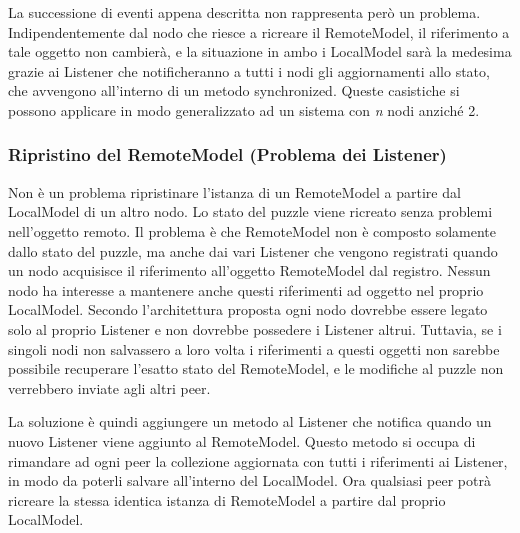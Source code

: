 \noindent La successione di eventi appena descritta non rappresenta però un problema. Indipendentemente dal nodo che riesce a ricreare il RemoteModel, il riferimento a tale oggetto non cambierà, e la situazione in ambo i LocalModel sarà la medesima grazie ai Listener che notificheranno a tutti i nodi gli aggiornamenti allo stato, che avvengono all'interno di un metodo synchronized. Queste casistiche si possono applicare in modo generalizzato ad un sistema con \textit{n} nodi anziché 2.

\subsubsection{Ripristino del RemoteModel (Problema dei Listener)}
Non è un problema ripristinare l'istanza di un RemoteModel a partire dal LocalModel di un altro nodo. Lo stato del puzzle viene ricreato senza problemi nell'oggetto remoto. Il problema è che RemoteModel non è composto solamente dallo stato del puzzle, ma anche dai vari Listener che vengono registrati quando un nodo acquisisce il riferimento all'oggetto RemoteModel dal registro.\newline
Nessun nodo ha interesse a mantenere anche questi riferimenti ad oggetto nel proprio LocalModel. Secondo l'architettura proposta ogni nodo dovrebbe essere legato solo al proprio Listener e non dovrebbe possedere i Listener altrui.\newline
Tuttavia, se i singoli nodi non salvassero a loro volta i riferimenti a questi oggetti non sarebbe possibile recuperare l'esatto stato del RemoteModel, e le modifiche al puzzle non verrebbero inviate agli altri peer.\newline

\noindent La soluzione è quindi aggiungere un metodo al Listener che notifica quando un nuovo Listener viene aggiunto al RemoteModel. Questo metodo si occupa di rimandare ad ogni peer la collezione aggiornata con tutti i riferimenti ai Listener, in modo da poterli salvare all'interno del LocalModel.\newline
Ora qualsiasi peer potrà ricreare la stessa identica istanza di RemoteModel a partire dal proprio LocalModel.


